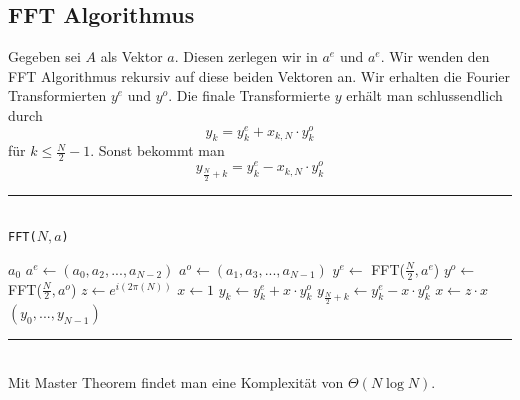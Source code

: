 \documentclass[a4paper, 12pt]{article}
\begin{document}
	\subsection{FFT Algorithmus}
	Gegeben sei $A$ als Vektor $a$. Diesen zerlegen wir in $a^e$ und $a^e$. Wir wenden den FFT Algorithmus rekursiv auf diese beiden Vektoren an. Wir erhalten die Fourier Transformierten $y^e$ und $y^o$. Die finale Transformierte $y$ erhält man schlussendlich durch \[y_k = y_k^e + x_{k,N}\cdot y_k^o\] für $k \leq \frac{N}{2}-1$. Sonst bekommt man \[y_{\frac{N}{2}+k} = y_k^e - x_{k,N}\cdot y_k^o\]
	\par\noindent\rule{\textwidth}{0.4pt}\\
	\texttt{FFT($N,a$)}
	\begin{algorithmic}[1]
		\Return $a_0$
		\Else
		\State $a^e \gets (a_0,a_2,...,a_{N-2})$
		\State $a^o \gets (a_1,a_3,...,a_{N-1})$
		\State $y^e \gets$ FFT($\frac{N}{2},a^e$)
		\State $y^o \gets$ FFT($\frac{N}{2},a^o$)
		\State $z \gets e^{i(2\pi(N))}$
		\State $x \gets 1$
		\State $y_k \gets y_k^e + x\cdot y_k^o$
		\State $y_{\frac{N}{2}+k} \gets y_k^e - x\cdot y_k^o$
		\State $x \gets z\cdot x$
		\EndFor
		\EndIf\\
		\Return $(y_0,...,y_{N-1})$ 
	\end{algorithmic}
	\par\noindent\rule{\textwidth}{0.4pt}\\
	Mit Master Theorem findet man eine Komplexität von $\Theta(N\log N)$.
\end{document}
